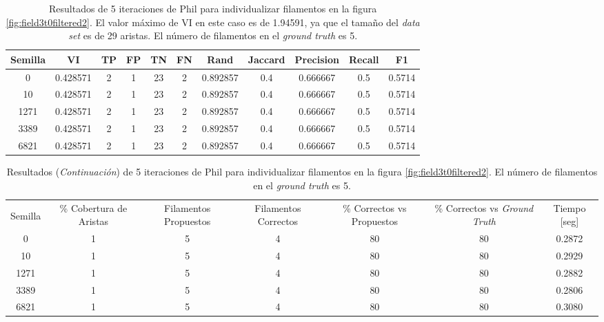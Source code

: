 \begin{table}[h]
    \centering
    \begin{tabular}{|c|c|c|c|c|c|c|c|c|c|c|}
    \hline
        Semilla & VI & TP & FP &TN &FN & Rand	& Jaccard &	Precision &	Recall &	F1 \\ \hline 
        0    & 0.428571 & 2 & 1 & 23 & 2 & 0.892857 & 0.4 & 0.666667 & 0.5 & 0.5714 \\
        10   & 0.428571 & 2 & 1 & 23 & 2 & 0.892857 & 0.4 & 0.666667 & 0.5 & 0.5714 \\
        1271 & 0.428571 & 2 & 1 & 23 & 2 & 0.892857 & 0.4 & 0.666667 & 0.5 & 0.5714 \\
        3389 & 0.428571 & 2 & 1 & 23 & 2 & 0.892857 & 0.4 & 0.666667 & 0.5 & 0.5714 \\
        6821 & 0.428571 & 2 & 1 & 23 & 2 & 0.892857 & 0.4 & 0.666667 & 0.5 & 0.5714 \\
        \hline
    \end{tabular}
    \caption{Resultados de 5 iteraciones de Phil para individualizar filamentos en la figura \ref{fig:field3t0filtered2}. El valor m\'aximo de VI en este caso es de 1.94591, ya que el tama\~no del {\it data set} es de 29 aristas. El n\'umero de filamentos en el {\it ground truth} es 5.}
    \label{tab:field3t0filtered2DetailedResults1}
\end{table}
\addtocounter{table}{-1}
\begin{table}[h]
    \centering
    \begin{tabular}{|c|c|c|c|c|c|c|}
    \hline
         & \multirow{4}{2cm}{\centering \% Cobertura de Aristas} & \multirow{4}{2cm}{Filamentos Propuestos} & \multirow{4}{2cm}{Filamentos Correctos} & \multirow{4}{2.5cm}{\% Correctos vs Propuestos} & \multirow{4}{2.5cm}{\centering \% Correctos vs {\it Ground Truth}} & \multirow{4}{1.2cm}{\centering Tiempo [seg]} \\
         &  &  &  & & &  \\
        Semilla &  &  &  & & &  \\
        &  &  &  & & &  \\ \hline 
        0 & 1 & 5 & 4 & 80 & 80 & 0.2872 \\
        10 & 1 & 5 & 4 & 80 & 80 & 0.2929\\
        1271 & 1 & 5 & 4 & 80 & 80 & 0.2882\\
        3389 & 1 & 5 & 4 & 80 & 80 & 0.2806\\
        6821 & 1 & 5 & 4 & 80 & 80 & 0.3080\\
        \hline
    \end{tabular}
    \caption{Resultados ({\it Continuaci\'on}) de 5 iteraciones de Phil para individualizar filamentos en la figura \ref{fig:field3t0filtered2}. El n\'umero de filamentos en el {\it ground truth} es 5.}
\end{table}